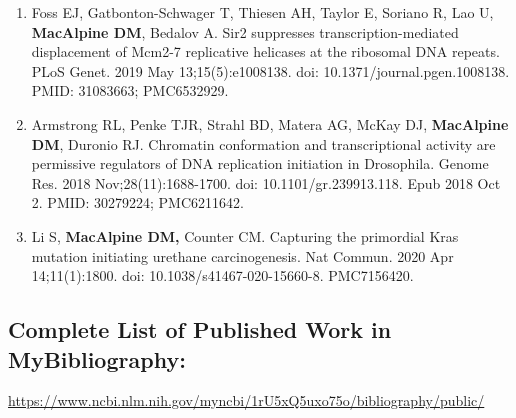 \documentclass{update_nihbiosketch}
\begin{document}
\begin{enumerate}
\begin{enumerate}
\item Foss EJ, Gatbonton-Schwager T, Thiesen AH, Taylor E, Soriano R, Lao U, \textbf{MacAlpine DM}, Bedalov A. Sir2 suppresses transcription-mediated displacement of Mcm2-7 replicative helicases at the ribosomal DNA repeats. PLoS Genet. 2019 May 13;15(5):e1008138. doi: 10.1371/journal.pgen.1008138. PMID: 31083663; PMC6532929.

\item Armstrong RL, Penke TJR, Strahl BD, Matera AG, McKay DJ, \textbf{MacAlpine DM}, Duronio RJ. Chromatin conformation and transcriptional activity are permissive regulators of DNA replication initiation in Drosophila. Genome Res. 2018 Nov;28(11):1688-1700. doi: 10.1101/gr.239913.118. Epub 2018 Oct 2. PMID: 30279224; PMC6211642.


\item Li S, \textbf{MacAlpine DM,} Counter CM. Capturing the primordial Kras mutation initiating urethane carcinogenesis. Nat Commun. 2020 Apr 14;11(1):1800. doi: 10.1038/s41467-020-15660-8. PMC7156420.

\end{enumerate}



\end{enumerate}

\subsection*{Complete List of Published Work in MyBibliography:} 
\medskip

\url{https://www.ncbi.nlm.nih.gov/myncbi/1rU5xQ5uxo75o/bibliography/public/}


\end{document}
